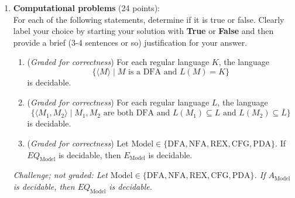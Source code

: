\documentclass[12pt, oneside]{article}
\newcommand{\gradeCorrect}{({\it Graded for correctness}) }
\newcommand{\gradeComplete}{({\it Graded for completeness}) }
\newcommand{\SUBSTRING}{\textsc{Substring}}
\begin{document}
\begin{enumerate}
\begin{enumerate}
    \item\gradeCorrect Prove that, given any nondeterministic Turing machine over 
    $\Gamma$, $N_L$, there is a nondeterministic Turing machine over 
    $\Gamma$ that recognizes $$\SUBSTRING(~L(N_L)~)$$
    In other words, you will prove that the class of Turing-recognizable languages 
    over $\Gamma$ is closed 
    under the $\SUBSTRING$ operation.
     A complete answer will 
    include both a precise construction of the machine and a 
    (brief) justification of why this machine works as required.
    
    \item\gradeComplete Give a different proof that the class of Turing-recognizable 
    languages over $\Gamma$ is closed 
    under the $\SUBSTRING$ operation, this time using only deterministic Turing machines.  A complete answer will 
    include both a precise construction of the machine and a 
    (brief) justification of why this machine works as required.

\end{enumerate}


\item \textbf{Computational problems} (24 points): \\
For each of the following statements, determine if it is true or false. 
Clearly label your choice 
by starting your solution with {\bf True} or {\bf False} and then
provide a brief (3-4 sentences or so) justification for your answer.

\begin{enumerate}
\item\gradeCorrect For each regular language $K$, the language 
\[
\{ \langle M \rangle \mid M \text{ is a DFA and } L(M) = K\} 
\]
is decidable.

\item\gradeCorrect For each regular language $L$, the language
\[
\{ \langle M_1, M_2 \rangle \mid M_1, M_2\text{ are both DFA and } 
L(M_1) \subseteq L \text{ and } L(M_2) \subseteq \overline{L}\}
\]
is decidable.


\item\gradeCorrect Let $\mathrm{Model} \in \{\mathrm{DFA}, \mathrm{NFA}, 
\mathrm{REX}, \mathrm{CFG}, \mathrm{PDA} \}$. If $EQ_{\mathrm{Model}}$ is decidable, 
then $E_{\mathrm{Model}}$ is decidable.

\end{enumerate}

{\it Challenge; not graded: Let $\mathrm{Model} \in \{\mathrm{DFA}, \mathrm{NFA}, 
\mathrm{REX}, \mathrm{CFG}, \mathrm{PDA} \}$. If $A_{\mathrm{Model}}$ is decidable, 
then $EQ_{\mathrm{Model}}$ is decidable.}

\end{enumerate}
\end{document}
